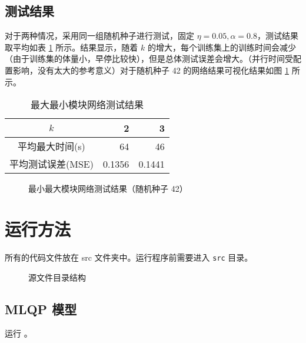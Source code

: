     \subsection{测试结果}

    对于两种情况，采用同一组随机种子进行测试，固定 $\eta=0.05, \alpha=0.8$，测试结果取平均如表 \ref{tab:minmax} 所示。结果显示，随着 $k$ 的增大，每个训练集上的训练时间会减少（由于训练集的体量小，早停比较快），但是总体测试误差会增大。（并行时间受配置影响，没有太大的参考意义）对于随机种子 42 的网络结果可视化结果如图 \ref{fig:boundary_minmax} 所示。

    \begin{table}[H]
        \centering
        \caption{最大最小模块网络测试结果}\label{tab:minmax}
        \begin{tabular}{crr}
            \toprule
            $k$ & 2 & 3 \\
            \midrule
            平均最大时间(s) & 64 & 46 \\
            平均测试误差(MSE) & 0.1356 & 0.1441 \\
            \bottomrule
        \end{tabular}
    \end{table}

    \begin{figure}[H]
        \centering
        \caption{最小最大模块网络测试结果（随机种子 42）}\label{fig:boundary_minmax}
    \end{figure}

    

    \appendix

    \section{运行方法}

    所有的代码文件放在 src 文件夹中。运行程序前需要进入 \texttt{src} 目录。
    
    \begin{figure}[H]
        \centering
        
        \caption{源文件目录结构}\label{fig:files}
    \end{figure}

    \subsection{MLQP 模型}
    运行 。


